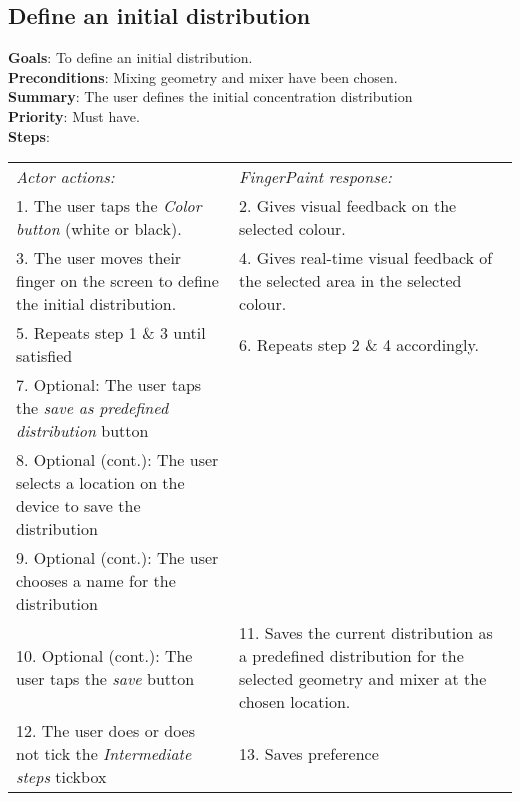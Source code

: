 \begin{appendices}
  \section{Define an initial distribution}
  \textbf{Goals}: To define an initial distribution.\\
  \textbf{Preconditions}: Mixing geometry and mixer have been chosen.\\
  \textbf{Summary}: The user defines the initial concentration distribution\\
  \textbf{Priority}: Must have.\\
  \textbf{Steps}: \\
  \begin{tabular}{ p{} p{} }
  	\emph{Actor actions:} & \emph{FingerPaint response:} \\
	1. The user taps the \emph{Color button} (white or black). & 2. Gives visual feedback on the selected colour. \\
	3. The user moves their finger on the screen to define the initial distribution. & 4. Gives real-time visual feedback of the selected area in the selected colour.\\
    5. Repeats step 1 \& 3 until satisfied & 6.	Repeats step 2 \& 4 accordingly. \\
    7.	Optional: The user taps the \emph{save as predefined distribution} button  & \\
    8. Optional (cont.): The user selects a location on the device to save the distribution & \\
    9. Optional (cont.): The user chooses a name for the distribution & \\
    10. Optional (cont.): The user taps the \emph{save} button & 11. Saves the current distribution as a predefined distribution for the selected geometry and mixer at the chosen location.\\
    12.	The user does or does not tick the \emph{Intermediate steps} tickbox & 13. Saves preference
  \end{tabular}


\end{appendices}

